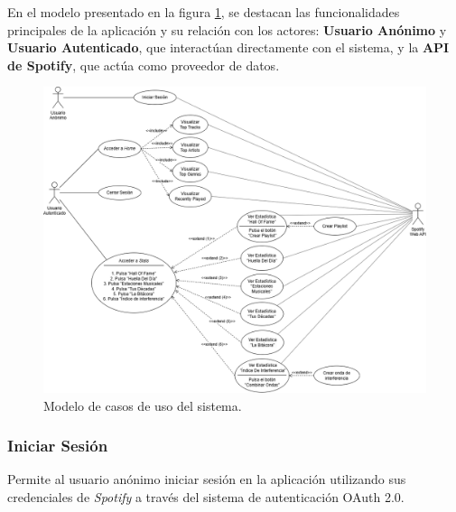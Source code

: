 En el modelo presentado en la figura \ref{fig:modelo_casos_uso}, se destacan las funcionalidades principales de la aplicación y su relación con los actores: \textbf{Usuario Anónimo} y \textbf{Usuario Autenticado}, que interactúan directamente con el sistema, y la \textbf{API de Spotify}, que actúa como proveedor de datos.

\begin{figure}[H]
    \centering
    \includegraphics[width=\textwidth]{figures/modelo_casos_uso.png}
    \caption{Modelo de casos de uso del sistema.}
    \label{fig:modelo_casos_uso}
\end{figure}


\subsubsection*{Iniciar Sesión}

Permite al usuario anónimo iniciar sesión en la aplicación utilizando sus credenciales de \textit{Spotify} a través del sistema de autenticación OAuth 2.0.

